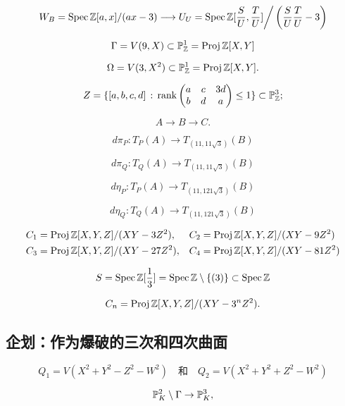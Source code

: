 \[
	W_B=\operatorname{Spec} \mathbb{Z}[a,x]/(ax-3)\longrightarrow U_U=\operatorname{Spec} \mathbb{Z}[\frac SU,\frac TU]\bigg / \left(\frac SU \frac TU-3\right)
\]

\[
	\Gamma = V(9,X)\subset \mathbb P_{\mathbb{Z}}^1=\operatorname{Proj} \mathbb{Z}[X,Y]
\]

\[
	\Omega=V(3,X^2)\subset \mathbb P_{\mathbb{Z}}^1=\operatorname{Proj} \mathbb{Z}[X,Y].
\]

\[
	Z=\{[a,b,c,d]\,:\,\operatorname{rank}\begin{pmatrix}
		a&c&3d\\ b&d&a
	\end{pmatrix}\leq 1\}\subset \mathbb P_{\mathbb{Z}}^3;
\]

\[
	A\longrightarrow B\longrightarrow C.
\]

\[
	d\pi_P:T_P(A)\longrightarrow T_{(11,11\sqrt 3)}(B)
\]

\[
	d\pi_Q:T_Q(A)\longrightarrow T_{(11,11\sqrt 3)}(B)
\]

\[
	d\eta_P:T_P(A)\longrightarrow T_{(11,121\sqrt 3)}(B)
\]


\[
	d\eta_Q:T_Q(A)\longrightarrow T_{(11,121\sqrt 3)}(B)
\]

\[
	\begin{aligned}
		&C_1=\operatorname{Proj} \mathbb{Z}[X,Y,Z]/(XY-3Z^2),&&C_2=\operatorname{Proj} \mathbb{Z}[X,Y,Z]/(XY-9Z^2)\\
		&C_3=\operatorname{Proj} \mathbb{Z}[X,Y,Z]/(XY-27Z^2),&&C_4=\operatorname{Proj} \mathbb{Z}[X,Y,Z]/(XY-81Z^2)
	\end{aligned}
\]

\[
	S=\operatorname{Spec} \mathbb{Z}[\frac 13]=\operatorname{Spec} \mathbb{Z}\setminus\{(3)\}\subset \operatorname{Spec} \mathbb{Z}
\]


\[
	C_n=\operatorname{Proj} \mathbb{Z}[X,Y,Z]/(XY-3^nZ^2).
\]

\subsection{企划：作为爆破的三次和四次曲面}\label{s:4.2.5}

\[
	Q_1=V(X^2+Y^2-Z^2-W^2)\quad \text{和}\quad Q_2=V(X^2+Y^2+Z^2-W^2)
\]


\[
	\mathbb{P}_K^2\setminus \Gamma\to \mathbb{P}_K^3,
\]